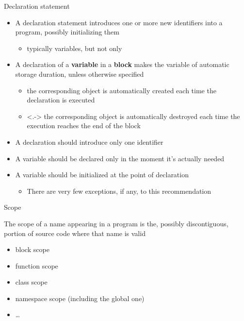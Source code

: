 \begin{frame}{Declaration statement}

  \begin{itemize}[<+->]
  \item A declaration statement introduces one or more new identifiers into a
    \Cpp{} program, possibly initializing them
    \begin{itemize}
    \item typically variables, but not only
    \end{itemize}

  \item A declaration of a \textbf{variable} in a \textbf{block} makes the
    variable of \alert{automatic storage duration}, unless otherwise specified
    \begin{itemize}
    \item the corresponding object is automatically created each time the
      declaration is executed
    \item<.-> the corresponding object is automatically destroyed each time the
      execution reaches the end of the block
    \end{itemize}

  \item A declaration should introduce only one identifier

  \item A variable should be declared only in the moment it's actually needed

  \item A variable should be initialized at the point of declaration
    \begin{itemize}
    \item There are very few exceptions, if any, to this recommendation
    \end{itemize}
  \end{itemize}

\end{frame}

\begin{frame}{Scope}

  The scope of a name appearing in a program is the, possibly
  discontiguous, portion of source code where that name is valid

  \begin{itemize}
  \item block scope
  \item function scope
  \item class scope
  \item namespace scope (including the global one)
  \item \ldots
  \end{itemize}

\end{frame}


